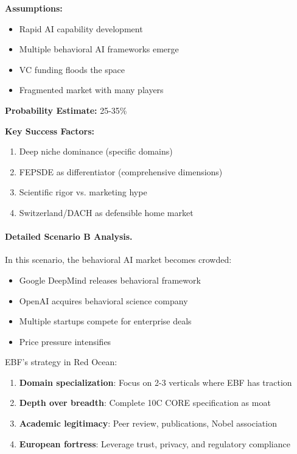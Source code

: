 \begin{tcolorbox}[colback=red!5!white, colframe=red!75!black,
    title=Scenario B: Red Ocean]

\textbf{Assumptions:}
\begin{itemize}[nosep]
\item Rapid AI capability development
\item Multiple behavioral AI frameworks emerge
\item VC funding floods the space
\item Fragmented market with many players
\end{itemize}

\textbf{Probability Estimate:} 25-35\%

\textbf{Key Success Factors:}
\begin{enumerate}[nosep]
\item Deep niche dominance (specific domains)
\item FEPSDE as differentiator (comprehensive dimensions)
\item Scientific rigor vs. marketing hype
\item Switzerland/DACH as defensible home market
\end{enumerate}

\end{tcolorbox}

\paragraph{Detailed Scenario B Analysis.}

In this scenario, the behavioral AI market becomes crowded:

\begin{itemize}
\item Google DeepMind releases behavioral framework
\item OpenAI acquires behavioral science company
\item Multiple startups compete for enterprise deals
\item Price pressure intensifies
\end{itemize}

EBF's strategy in Red Ocean:
\begin{enumerate}
\item \textbf{Domain specialization}: Focus on 2-3 verticals where EBF has traction
\item \textbf{Depth over breadth}: Complete 10C CORE specification as moat
\item \textbf{Academic legitimacy}: Peer review, publications, Nobel association
\item \textbf{European fortress}: Leverage trust, privacy, and regulatory compliance
\end{enumerate}


